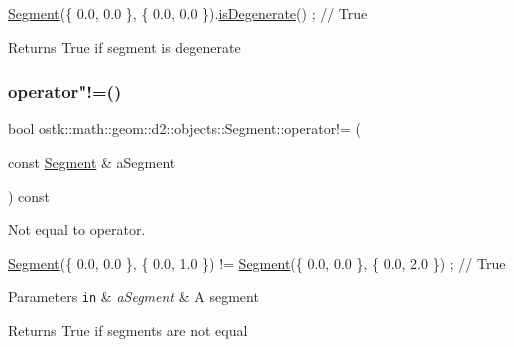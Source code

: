 \begin{DoxyCode}
\hyperlink{classostk_1_1math_1_1geom_1_1d2_1_1objects_1_1_segment_a56c91f22315d7cefe9d5e9973330028d}{Segment}(\{ 0.0, 0.0 \}, \{ 0.0, 0.0 \}).\hyperlink{classostk_1_1math_1_1geom_1_1d2_1_1objects_1_1_segment_a35a46e06daf7d791b0069641cf684f91}{isDegenerate}() ; \textcolor{comment}{// True}
\end{DoxyCode}


\begin{DoxyReturn}{Returns}
True if segment is degenerate 
\end{DoxyReturn}
\mbox{\label{classostk_1_1math_1_1geom_1_1d2_1_1objects_1_1_segment_a3a2de88cdbd141be1bfd22945e3fa100}} 
\subsubsection{\texorpdfstring{operator"!=()}{operator!=()}}
{\footnotesize\ttfamily bool ostk\+::math\+::geom\+::d2\+::objects\+::\+Segment\+::operator!= (\begin{DoxyParamCaption}\item[{const \hyperlink{classostk_1_1math_1_1geom_1_1d2_1_1objects_1_1_segment}{Segment} \&}]{a\+Segment }\end{DoxyParamCaption}) const}



Not equal to operator. 


\begin{DoxyCode}
\hyperlink{classostk_1_1math_1_1geom_1_1d2_1_1objects_1_1_segment_a56c91f22315d7cefe9d5e9973330028d}{Segment}(\{ 0.0, 0.0 \}, \{ 0.0, 1.0 \}) != \hyperlink{classostk_1_1math_1_1geom_1_1d2_1_1objects_1_1_segment_a56c91f22315d7cefe9d5e9973330028d}{Segment}(\{ 0.0, 0.0 \}, \{ 0.0, 2.0 \}) ; \textcolor{comment}{// True}
\end{DoxyCode}



\begin{DoxyParams}[1]{Parameters}
\mbox{\tt in}  & {\em a\+Segment} & A segment \\
\hline
\end{DoxyParams}
\begin{DoxyReturn}{Returns}
True if segments are not equal 
\end{DoxyReturn}
\mbox{\label{classostk_1_1math_1_1geom_1_1d2_1_1objects_1_1_segment_a1b6b81c43a1f80a4ddd07ac62943db24}} 

